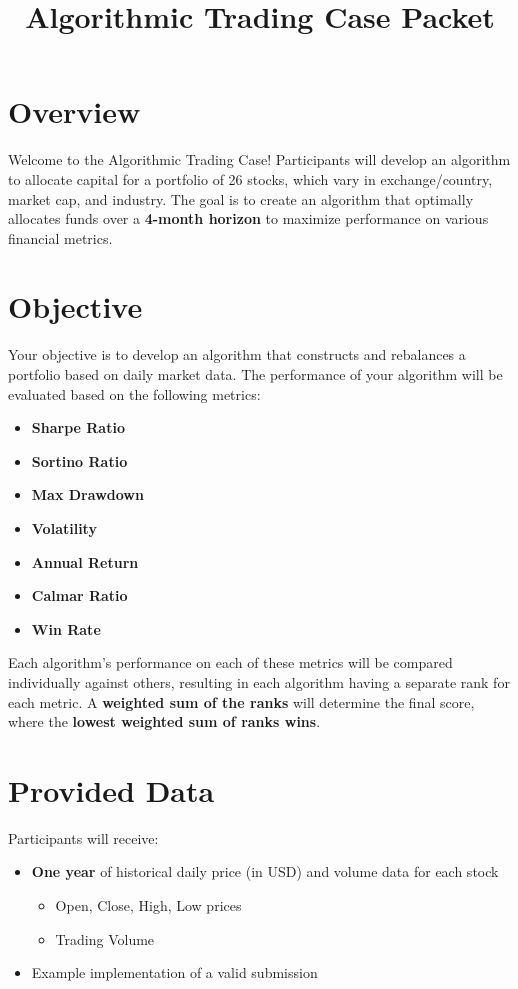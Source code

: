 \documentclass{article}
\title{Algorithmic Trading Case Packet}
\date{}
\begin{document}
\maketitle

\section{Overview}
Welcome to the Algorithmic Trading Case! Participants will develop an algorithm to allocate capital for a portfolio of 26 stocks, which vary in exchange/country, market cap, and industry. The goal is to create an algorithm that optimally allocates funds over a \textbf{4-month horizon} to maximize performance on various financial metrics.

\section{Objective}
Your objective is to develop an algorithm that constructs and rebalances a portfolio based on daily market data. The performance of your algorithm will be evaluated based on the following metrics:
\begin{itemize}
    \item \textbf{Sharpe Ratio}
    \item \textbf{Sortino Ratio}
    \item \textbf{Max Drawdown}
    \item \textbf{Volatility}
    \item \textbf{Annual Return}
    \item \textbf{Calmar Ratio}
    \item \textbf{Win Rate}
\end{itemize}

Each algorithm's performance on each of these metrics will be compared individually against others, resulting in each algorithm having a separate rank for each metric. A \textbf{weighted sum of the ranks} will determine the final score, where the \textbf{lowest weighted sum of ranks wins}.

\section{Provided Data}
Participants will receive:
\begin{itemize}
    \item \textbf{One year} of historical daily price (in USD) and volume data for each stock
    \begin{itemize}
        \item Open, Close, High, Low prices
        \item Trading Volume
    \end{itemize}
    \item Example implementation of a valid submission
\end{itemize}
\end{document}
